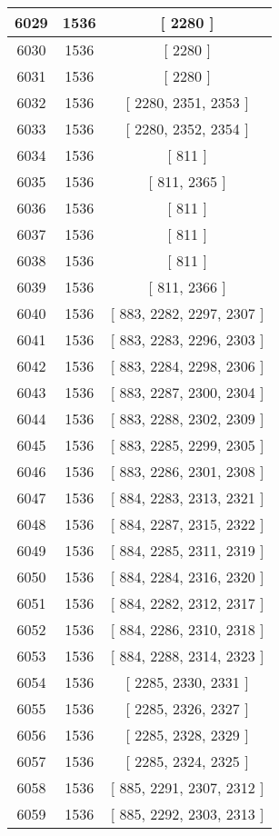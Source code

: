 \begin{center}
\begin{longtable}[H]{|| c c c ||}
\hline
6029 & 1536 & [ 2280 ] \\ 
\hline
6030 & 1536 & [ 2280 ] \\ 
\hline
6031 & 1536 & [ 2280 ] \\ 
\hline
6032 & 1536 & [ 2280, 2351, 2353 ] \\ 
\hline
6033 & 1536 & [ 2280, 2352, 2354 ] \\ 
\hline
6034 & 1536 & [ 811 ] \\ 
\hline
6035 & 1536 & [ 811, 2365 ] \\ 
\hline
6036 & 1536 & [ 811 ] \\ 
\hline
6037 & 1536 & [ 811 ] \\ 
\hline
6038 & 1536 & [ 811 ] \\ 
\hline
6039 & 1536 & [ 811, 2366 ] \\ 
\hline
6040 & 1536 & [ 883, 2282, 2297, 2307 ] \\ 
\hline
6041 & 1536 & [ 883, 2283, 2296, 2303 ] \\ 
\hline
6042 & 1536 & [ 883, 2284, 2298, 2306 ] \\ 
\hline
6043 & 1536 & [ 883, 2287, 2300, 2304 ] \\ 
\hline
6044 & 1536 & [ 883, 2288, 2302, 2309 ] \\ 
\hline
6045 & 1536 & [ 883, 2285, 2299, 2305 ] \\ 
\hline
6046 & 1536 & [ 883, 2286, 2301, 2308 ] \\ 
\hline
6047 & 1536 & [ 884, 2283, 2313, 2321 ] \\ 
\hline
6048 & 1536 & [ 884, 2287, 2315, 2322 ] \\ 
\hline
6049 & 1536 & [ 884, 2285, 2311, 2319 ] \\ 
\hline
6050 & 1536 & [ 884, 2284, 2316, 2320 ] \\ 
\hline
6051 & 1536 & [ 884, 2282, 2312, 2317 ] \\ 
\hline
6052 & 1536 & [ 884, 2286, 2310, 2318 ] \\ 
\hline
6053 & 1536 & [ 884, 2288, 2314, 2323 ] \\ 
\hline
6054 & 1536 & [ 2285, 2330, 2331 ] \\ 
\hline
6055 & 1536 & [ 2285, 2326, 2327 ] \\ 
\hline
6056 & 1536 & [ 2285, 2328, 2329 ] \\ 
\hline
6057 & 1536 & [ 2285, 2324, 2325 ] \\ 
\hline
6058 & 1536 & [ 885, 2291, 2307, 2312 ] \\ 
\hline
6059 & 1536 & [ 885, 2292, 2303, 2313 ] \\ 

\end{longtable}
\end{center}
